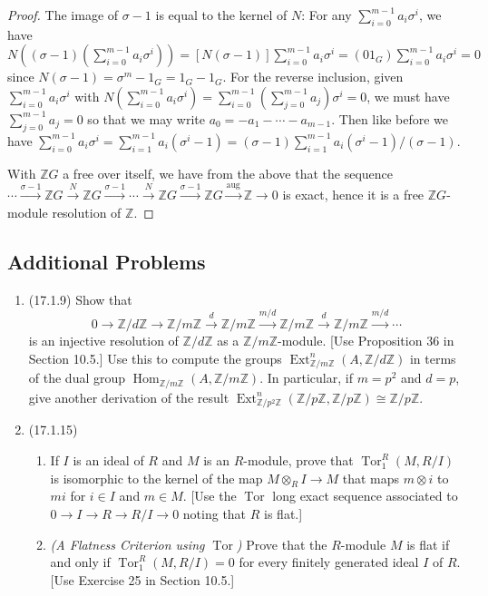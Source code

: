 \documentclass[11pt]{article}
\DeclareMathOperator{\Tor}{Tor}
\DeclareMathOperator{\Hom}{Hom}
\DeclareMathOperator{\Ext}{Ext}
\DeclareMathOperator{\aug}{aug}
\begin{document}
\begin{enumerate}
\begin{enumerate}
\begin{proof}
            The image of $\sigma-1$ is equal to the kernel of $N$: For any $\sum_{i=0}^{m-1}a_i\sigma^i$, we have $N((\sigma-1)(\sum_{i=0}^{m-1}a_i\sigma^i)) = [N(\sigma-1)]\sum_{i=0}^{m-1}a_i\sigma^i = (01_G)\sum_{i=0}^{m-1}a_i\sigma^i = 0$ since $N(\sigma-1) = \sigma^m-1_G = 1_G - 1_G$. For the reverse inclusion, given $\sum_{i=0}^{m-1}a_i\sigma^i$ with $N(\sum_{i=0}^{m-1}a_i\sigma^i) = \sum_{i=0}^{m-1}(\sum_{j=0}^{m-1}a_j)\sigma^i = 0$, we must have $\sum_{j=0}^{m-1}a_j = 0$ so that we may write $a_0 = -a_1-\cdots-a_{m-1}$. Then like before we have $\sum_{i=0}^{m-1}a_i\sigma^i = \sum_{i=1}^{m-1}a_i(\sigma^i-1) = (\sigma-1)\sum_{i=1}^{m-1}a_i(\sigma^i-1)/(\sigma-1)$.

            With $\mathbb{Z}G$ a free over itself, we have from the above that the sequence $\cdots\xrightarrow{\sigma-1}\mathbb{Z}G\xrightarrow{N}\mathbb{Z}G\xrightarrow{\sigma-1}\cdots\xrightarrow{N}\mathbb{Z}G\xrightarrow{\sigma-1}\mathbb{Z}G\xrightarrow{\aug}\mathbb{Z}\to 0$ is exact, hence it is a free $\mathbb{Z}G$-module resolution of $\mathbb{Z}$.
        \end{proof}
    \end{enumerate}
\end{enumerate}
\subsection*{Additional Problems}
\begin{enumerate}
    \item (17.1.9)
    Show that \[0\to \mathbb{Z}/d\mathbb{Z}\to\mathbb{Z}/m\mathbb{Z}\xrightarrow{d}\mathbb{Z}/m\mathbb{Z}\xrightarrow{m/d}\mathbb{Z}/m\mathbb{Z}\xrightarrow{d}\mathbb{Z}/m\mathbb{Z}\xrightarrow{m/d}\cdots \] is an injective resolution of $\mathbb{Z}/d\mathbb{Z}$ as a $\mathbb{Z}/m\mathbb{Z}$-module. [Use Proposition 36 in Section 10.5.] Use this to compute the groups $\Ext_{\mathbb{Z}/m\mathbb{Z}}^n(A,\mathbb{Z}/d\mathbb{Z})$ in terms of the dual group $\Hom_{\mathbb{Z}/m\mathbb{Z}}(A,\mathbb{Z}/m\mathbb{Z})$. In particular, if $m = p^2$ and $d = p$, give another derivation of the result $\Ext_{\mathbb{Z}/p^2\mathbb{Z}}^n(\mathbb{Z}/p\mathbb{Z},\mathbb{Z}/p\mathbb{Z})\cong \mathbb{Z}/p\mathbb{Z}$.
    \item (17.1.15)\begin{enumerate}
        \item If $I$ is an ideal of $R$ and $M$ is an $R$-module, prove that $\Tor_1^R(M,R/I)$ is isomorphic to the kernel of the map $M\otimes_R I\to M$ that maps $m\otimes i$ to $mi$ for $i\in I$ and $m\in M$. [Use the $\Tor$ long exact sequence associated to $0\to I\to R \to R/I\to 0$ noting that $R$ is flat.]
        \item \textit{(A Flatness Criterion using $\Tor$)} Prove that the $R$-module $M$ is flat if and only if $\Tor_1^R(M,R/I) = 0$ for every finitely generated ideal $I$ of $R$. [Use Exercise 25 in Section 10.5.]
    \end{enumerate}
\end{enumerate}
\end{document}
